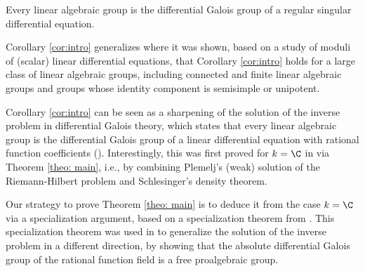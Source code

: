 \documentclass[a4paper, 11pt]{article}
\begin{document}
\begin{corollary} \label{cor:intro}
Every linear algebraic group is the differential Galois group of a regular singular differential equation. 
\end{corollary}	
Corollary \ref{cor:intro} generalizes \cite[Theorem 4.3]{Singer:ModuliOfLinearDifferentialEquationsOnTheRiemannSphereWithFixedGaloisGroups} where it was shown, based on a study of moduli of (scalar) linear differential equations, that Corollary \ref{cor:intro}
holds for a large class of linear algebraic groups, including connected and finite linear algebraic groups and groups whose identity component is semisimple or unipotent.


Corollary \ref{cor:intro} can be seen as a sharpening of the solution of the inverse problem in differential Galois theory, which states that every linear algebraic group is the differential Galois group of a linear differential equation with rational function coefficients (\cite{inverse}). Interestingly, this was first proved for $k=\C$ in \cite{TretkoffTretkoff:SolutionOfTheInverseProblem} via Theorem \ref{theo: main}, i.e., by combining Plemelj's (weak) solution of the Riemann-Hilbert problem and Schlesinger's density theorem. 


Our strategy to prove Theorem \ref{theo: main} is to deduce it from the case $k=\C$ via a specialization argument, based on a specialization theorem from \cite{fengwib}. This specialization theorem was used in \cite{fengwib} to generalize the solution of the inverse problem in a different direction, by showing that the absolute differential Galois group of the rational function field is a free proalgebraic group.
\end{document}
